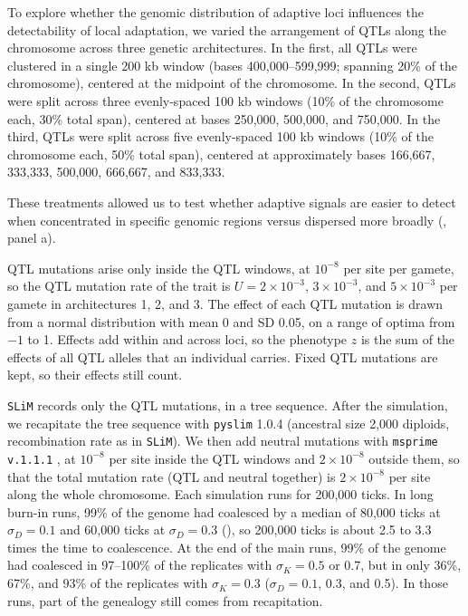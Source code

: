 \documentclass[]{article}
\newcommand{\slim}{\texttt{SLiM}\xspace}
\providecommand{\revpoint}[2]{}%
\providecommand{\llabel}[1]{}%
\begin{document}
To explore whether the genomic distribution of adaptive loci
influences the detectability of local adaptation,
we varied the arrangement of QTLs along the chromosome
across three genetic architectures. 
In the first, 
all QTLs were clustered in a single 200 kb window 
(bases 400,000–599,999; spanning 20\% of the chromosome), 
centered at the midpoint of the chromosome. 
In the second, 
QTLs were split across three evenly-spaced 100 kb windows 
(10\% of the chromosome each, 30\% total span), 
centered at bases 250,000, 500,000, and 750,000. 
In the third, 
QTLs were split across five evenly-spaced 100 kb windows 
(10\% of the chromosome each, 50\% total span), 
centered at approximately bases 166,667, 333,333, 500,000, 666,667, and 833,333.

These treatments allowed us to test whether adaptive 
signals are easier to detect when concentrated in 
specific genomic regions versus dispersed more broadly 
(, panel a).

QTL mutations arise only inside the QTL windows,
at $10^{-8}$ per site per gamete,\revpoint{1}{5}
so the QTL mutation rate of the trait is
$U = 2 \times 10^{-3}$, $3 \times 10^{-3}$, and $5 \times 10^{-3}$
per gamete in architectures 1, 2, and 3.
The effect of each QTL mutation is drawn from a normal distribution
with mean 0 and SD 0.05,
on a range of optima from $-1$ to 1.
Effects add within and across loci,
so the phenotype $z$ is the sum of the effects
of all QTL alleles that an individual carries.
Fixed QTL mutations are kept, so their effects still count.

\slim records only the QTL mutations, in a tree sequence.
After the simulation, we recapitate the tree sequence
with \texttt{pyslim} 1.0.4 \citep{haller2019treeseq}
(ancestral size 2,000 diploids, recombination rate as in \slim).
We then add neutral mutations
with \texttt{msprime} \texttt{v.1.1.1} \citep{baumdicker2022efficient},
at $10^{-8}$ per site inside the QTL windows
and $2 \times 10^{-8}$ outside them,
so that the total mutation rate (QTL and neutral together)
is $2 \times 10^{-8}$ per site along the whole chromosome.
Each simulation runs for 200,000 ticks.\llabel{simrunlength}
In long burn-in runs, 99\% of the genome had coalesced
by a median of 80,000 ticks at $\sigma_D = 0.1$
and 60,000 ticks at $\sigma_D = 0.3$ (),
so 200,000 ticks is about 2.5 to 3.3 times the time to coalescence.
At the end of the main runs, 99\% of the genome had coalesced
in 97--100\% of the replicates with $\sigma_K = 0.5$ or 0.7,
but in only 36\%, 67\%, and 93\% of the replicates with $\sigma_K = 0.3$
($\sigma_D = 0.1$, 0.3, and 0.5).
In those runs, part of the genealogy still comes from recapitation.
\end{document}
